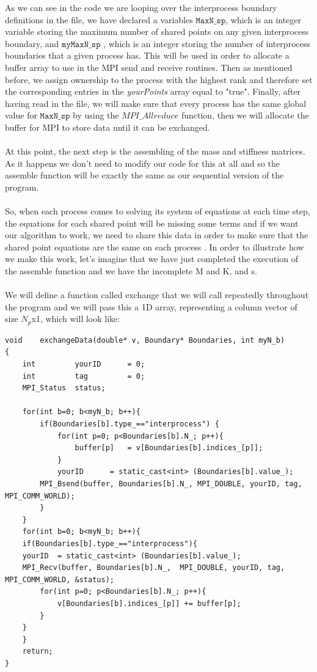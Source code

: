 \documentclass[12pt]{article}
\begin{document}
As we can see in the code we are looping over the interprocess boundary definitions in the file, we have declared
a variables $\texttt{MaxN\_sp}$, which is an integer variable storing the maximum number of shared points on any given interprocess boundary, and $\texttt{myMaxN\_sp}$ , which is an integer storing the number of interprocess boundaries that a given process has. This will be used in order to allocate a buffer array to use in the MPI send and receive routines. Then as mentioned before, we assign ownership to the process with the highest rank and therefore set the corresponding entries in the \textit{yourPoints} array equal to "true". Finally, after having read in the file, we will make sure that every process has the same global value for $\texttt{MaxN\_sp}$ by using the $MPI\_Allreduce$ function, then we will allocate the buffer for MPI to store data until it can be exchanged.
\\\\
At this point, the next step is the assembling of the mass and stiffness matrices. As it happens we don't need to modify our code for this at all and so the assemble function will be exactly the same as our sequential version of the program.
\\\\
So, when each process comes to solving its system of equations at each time step, the equations for each shared point will be missing some terms and if we want our algorithm to work, we need to share this data in order to make sure that the shared point equations are the same on each process \cite{Steve13}. In order to illustrate how we make this work, let's imagine that we have just completed the execution of the assemble function and we have the incomplete M and K, and s.
\\\\
We will define a function called exchange that we will call repeatedly throughout the program and we will pass this a 1D
array, representing a column vector of size $N_p$x1, which will look like:

\begin{lstlisting}[style=MyC++Style] 
void	exchangeData(double* v, Boundary* Boundaries, int myN_b)
{
	int			yourID		= 0;
	int			tag			= 0;
	MPI_Status	status;

	for(int b=0; b<myN_b; b++){
		if(Boundaries[b].type_=="interprocess")	{
			for(int p=0; p<Boundaries[b].N_; p++){
				buffer[p]	= v[Boundaries[b].indices_[p]];
			}
			yourID		= static_cast<int> (Boundaries[b].value_);
		MPI_Bsend(buffer, Boundaries[b].N_,	MPI_DOUBLE,	yourID,	tag, MPI_COMM_WORLD);
		}
	}
	for(int b=0; b<myN_b; b++){
	if(Boundaries[b].type_=="interprocess"){
	yourID	= static_cast<int> (Boundaries[b].value_);
	MPI_Recv(buffer, Boundaries[b].N_,	MPI_DOUBLE,	yourID,	tag, MPI_COMM_WORLD, &status);
		for(int p=0; p<Boundaries[b].N_; p++){
			v[Boundaries[b].indices_[p]] += buffer[p];
		}
	}
	}
	return;
}
\end{lstlisting}
\end{document}
